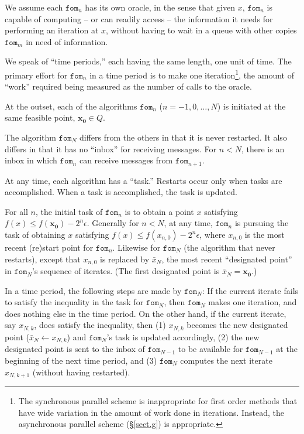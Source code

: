 \documentclass[reqno, 11pt]{amsart}
\numberwithin{equation}{section}
\newcommand{\fom}{\mathtt{fom}}
\begin{document}
We assume each $ \fom_n $ has its own oracle, in the sense that given $ x $, $ \fom_n $ is capable of computing -- or can readily access -- the information it needs for performing an iteration at $ x $, without having to wait in a queue with other copies $ \fom_m $ in need of information. 

We speak of ``time periods,'' each having the same length, one unit of time. The primary effort for $ \fom_n $ in a time period is to make one iteration\footnote{The synchronous parallel scheme is inappropriate for first order methods that have wide variation in the amount of work done in iterations. Instead, the asynchronous parallel scheme (\S\ref{sect.g}) is appropriate.}, the amount of ``work'' required being measured as the number of calls to the oracle.

At the outset, each of the algorithms $ \fom_n $ ($ n = -1, 0, \ldots, N $) is initiated at the same feasible point, $ \mathbf{x_0} \in Q $. 

The algorithm $ \fom_{N} $ differs from the others in that it is never restarted. It also differs in that it has no ``inbox'' for receiving messages. For $ n < N $, there is an inbox in which $ \fom_n $ can receive messages from $ \fom_{n+1} $. 

At any time, each algorithm has a ``task.'' Restarts occur only when tasks are accomplished. When a task is accomplished, the task is updated.

For all $ n $, the initial task of $ \fom_n $ is to obtain a point $ x $ satisfying $ f(x) \leq f( \mathbf{x_0}) - 2^n \epsilon $. Generally for $ n < N  $, at any time, $ \fom_n $ is pursuing the task of obtaining  $ x $ satisfying $ f(x) \leq f(x_{n,0}) - 2^n \epsilon $, where $ x_{n,0} $ is the most recent (re)start point for $ \fom_n $. Likewise for $ \fom_N $ (the algorithm that never restarts), except that $ x_{n,0} $ is replaced by $ \bar{x}_N $, the most recent ``designated point'' in $ \fom_N $'s sequence of iterates. (The first designated point is $ \bar{x}_N = \mathbf{x_0} $.) 

In a time period, the following steps are made by $ \fom_{N} $:  If the current iterate fails to satisfy the inequality in the task for $ \fom_{N} $, then $ \fom_{N} $ makes one iteration, and does nothing else in the time period. On the other hand, if the current iterate, say $ x_{N,k} $,  does satisfy the inequality, then (1) $ x_{N,k} $ becomes the new designated point ($ \bar{x}_N \leftarrow x_{N,k} $) and $ \fom_N $'s task is updated accordingly, (2) the new designated point is sent to the inbox of $ \fom_{N-1} $ to be available  for $ \fom_{N-1} $ at the beginning of the next time period, and (3) $ \fom_N $ computes the next iterate $ x_{N,k+1} $  (without having restarted).
\end{document}
